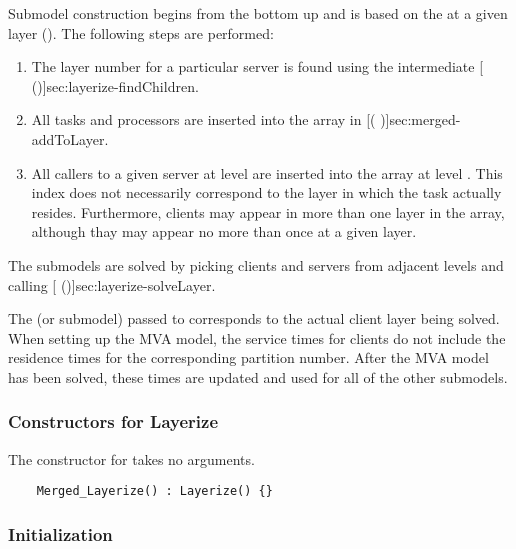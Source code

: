 Submodel construction begins from the bottom up and is based on the
 at a given layer ().  The following steps are
performed:
\begin{enumerate}
\item The layer number for a particular server is found using the
  intermediate [
  (\Sec\Ref)]{sec:layerize-findChildren}.
\item All tasks and processors are inserted into the 
  array in [(
  \Sec\Ref)]{sec:merged-addToLayer}.
\item All callers to a given server at level  are inserted
  into the  array at level .  This index does
  not necessarily correspond to the layer in which the task actually
  resides.  Furthermore, clients may appear in more than one layer in
  the  array, although thay may appear no more than once
  at a given layer.
\end{enumerate}
The submodels are solved by picking clients and servers from adjacent
levels and calling
[ (\Sec\Ref)]{sec:layerize-solveLayer}.  

The  (or submodel) passed to
 corresponds to the
actual client layer being solved.  When setting up the MVA model, the
service times for clients do not include the residence times for the
corresponding partition number.  After the MVA model has been solved,
these times are updated and used for all of the other submodels.

\subsubsection{Constructors for Layerize}

The constructor for  takes no arguments.  

\begin{verbatim}
    Merged_Layerize() : Layerize() {}
\end{verbatim}

\subsubsection{Initialization}

